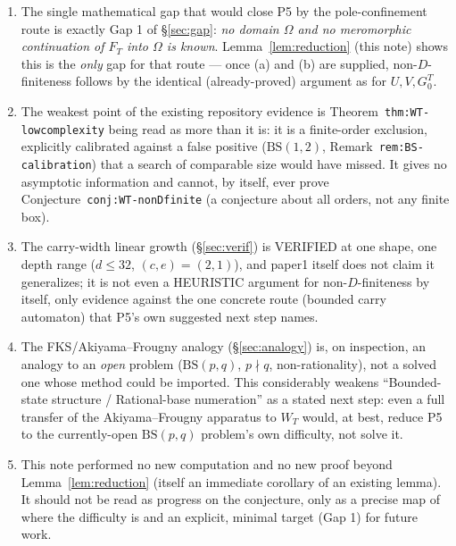 \documentclass[11pt]{article}
\theoremstyle{remark}
\begin{document}
\begin{enumerate}
\item The single mathematical gap that would close P5 by the pole-confinement route is exactly Gap 1
of \S\ref{sec:gap}: \emph{no domain $\Omega$ and no meromorphic continuation of $F_T$ into $\Omega$ is
known}. Lemma~\ref{lem:reduction} (this note) shows this is the \emph{only} gap for that route — once
(a) and (b) are supplied, non-$D$-finiteness follows by the identical (already-proved) argument as for
$U,V,G^T_0$.
\item The weakest point of the existing repository evidence is Theorem~\texttt{thm:WT-lowcomplexity}
being read as more than it is: it is a finite-order exclusion, explicitly calibrated against a false
positive ($\mathrm{BS}(1,2)$, Remark~\texttt{rem:BS-calibration}) that a search of comparable size would
have missed. It gives no asymptotic information and cannot, by itself, ever prove
Conjecture~\texttt{conj:WT-nonDfinite} (a conjecture about all orders, not any finite box).
\item The carry-width linear growth (\S\ref{sec:verif}) is VERIFIED at one shape, one depth range
($d\le32$, $(c,e)=(2,1)$), and paper1 itself does not claim it generalizes; it is not even a HEURISTIC
argument for non-$D$-finiteness by itself, only evidence against the one concrete route (bounded carry
automaton) that P5's own suggested next step names.
\item The FKS/Akiyama--Frougny analogy (\S\ref{sec:analogy}) is, on inspection, an analogy to an
\emph{open} problem ($\mathrm{BS}(p,q)$, $p\nmid q$, non-rationality), not a solved one whose method could
be imported. This considerably weakens ``Bounded-state structure / Rational-base numeration'' as a
stated next step: even a full transfer of the Akiyama--Frougny apparatus to $W_T$ would, at best, reduce
P5 to the currently-open $\mathrm{BS}(p,q)$ problem's own difficulty, not solve it.
\item This note performed no new computation and no new proof beyond Lemma~\ref{lem:reduction} (itself
an immediate corollary of an existing lemma). It should not be read as progress on the conjecture, only
as a precise map of where the difficulty is and an explicit, minimal target (Gap 1) for future work.
\end{enumerate}
\end{document}
